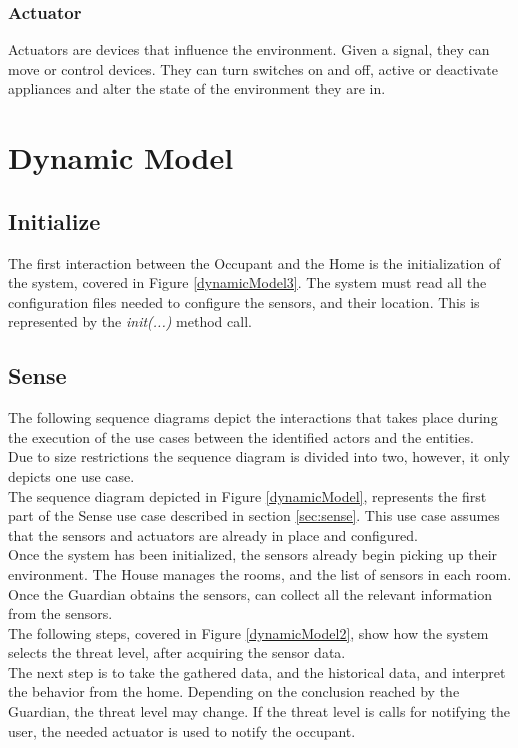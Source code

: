 \subsubsection{Actuator}
Actuators are devices that influence the environment. Given a signal, they can move or control devices. They can turn switches on and off, active or deactivate appliances and alter the state of the environment they are in.


\section{Dynamic Model}

\subsection{Initialize}

The first interaction between the Occupant and the Home is the initialization of the system, covered in Figure \ref{dynamicModel3}. The system must read all the configuration files needed to configure the sensors, and their location. This is represented by the \textit{init(...)} method call.
\\


\subsection{Sense}
The following sequence diagrams depict the interactions that takes place during the execution of the use cases between the identified actors and the entities. \\ 
Due to size restrictions the sequence diagram is divided into two, however, it only depicts one use case. \\
The sequence diagram depicted in Figure \ref{dynamicModel}, represents the first part of the Sense use case described in section \ref{sec:sense}. This use case assumes that the sensors and actuators are already in place and configured. \\

Once the system has been initialized, the sensors already begin picking up their environment. The House manages the rooms, and the list of sensors in each room. Once the Guardian obtains the sensors, can collect all the relevant information from the sensors.\\
The following steps, covered in Figure \ref{dynamicModel2}, show how the system selects the threat level, after acquiring the sensor data. \\
The next step is to take the gathered data, and the historical data, and interpret the behavior from the home. 
Depending on the conclusion reached by the Guardian, the threat level may change. If the threat level is calls for notifying the user, the needed actuator is used to notify the occupant.

